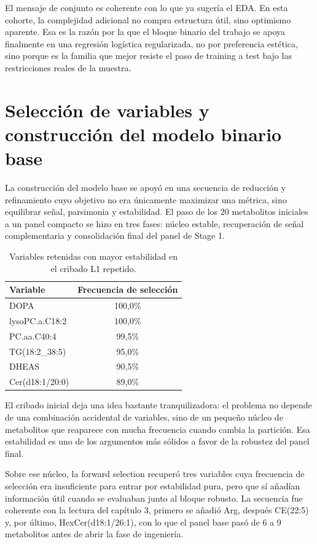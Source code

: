 El mensaje de conjunto es coherente con lo que ya sugería el EDA. En esta cohorte, la complejidad adicional no compra
estructura útil, sino optimismo aparente. Esa es la razón por la que el bloque binario del trabajo se apoya finalmente
en una regresión logística regularizada, no por preferencia estética, sino porque es la familia que mejor resiste el
paso de training a test bajo las restricciones reales de la muestra.

\section{Selección de variables y construcción del modelo binario base}\label{sec:seleccion}

La construcción del modelo base se apoyó en una secuencia de reducción y refinamiento cuyo objetivo no era únicamente maximizar una métrica, sino equilibrar señal, parsimonia y estabilidad. El paso de los 20 metabolitos iniciales a un panel compacto se hizo en tres fases: núcleo estable, recuperación de señal complementaria y consolidación final del panel de Stage 1.

\begin{table}[ht]
\centering
\caption{Variables retenidas con mayor estabilidad en el cribado L1 repetido.}
\label{tab:stability_results}
\begin{tabular}{lc}
\hline
\textbf{Variable} & \textbf{Frecuencia de selección} \\
\hline
DOPA & 100,0\% \\
lysoPC.a.C18:2 & 100,0\% \\
PC.aa.C40:4 & 99,5\% \\
TG(18:2\_38:5) & 95,0\% \\
DHEAS & 90,5\% \\
Cer(d18:1/20:0) & 89,0\% \\
\hline
\end{tabular}
\end{table}

El cribado inicial deja una idea bastante tranquilizadora: el problema no depende de una combinación accidental de
variables, sino de un pequeño núcleo de metabolitos que reaparece con mucha frecuencia cuando cambia la partición. Esa
estabilidad es uno de los argumentos más sólidos a favor de la robustez del panel final.

Sobre ese núcleo, la forward selection recuperó tres variables cuya frecuencia de selección era insuficiente para entrar
por estabilidad pura, pero que sí añadían información útil cuando se evaluaban junto al bloque robusto. La secuencia fue
coherente con la lectura del capítulo 3, primero se añadió Arg, después CE(22:5) y, por último,
HexCer(d18:1/26:1), con lo que el panel base pasó de 6 a 9 metabolitos antes de abrir la fase de ingeniería.

